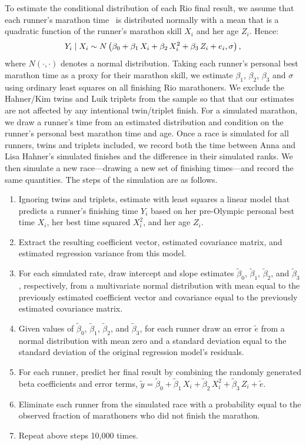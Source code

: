 \documentclass[12pt,titlepage]{article}
\begin{document}
To estimate the conditional distribution of each Rio final result, we
assume that each runner's marathon time \Yi\ is distributed normally
with a mean that is a quadratic function of the runner's marathon skill $X_i$ and her age $Z_i$. Hence:
$$Y_i \mid X_i \sim N\left(\beta_0 + \beta_1\,X_{i} + \beta_2\,X^2_{i}  + \beta_3\,Z_{i} + e_i, \sigma\right),$$
where $N\left(\cdot,\cdot\right)$ denotes a normal distribution. Taking each runner's 
personal best marathon time as a proxy for their marathon skill, we
estimate $\beta_1$, $\beta_2$, $\beta_3$ and $\sigma$ using ordinary least
squares on all finishing Rio marathoners.  We exclude the Hahner/Kim
twins and Luik triplets from the sample so that that our estimates are not affected by any intentional twin/triplet finish.  
For a simulated marathon, we draw a runner's
time from an estimated distribution and condition on the runner's
personal best marathon time and age.  Once a race is simulated for all
runners, twins and triplets included, we record both the time between
Anna and Lisa Hahner's simulated finishes and the difference in their
simulated ranks.  We then simulate a new race---drawing a new set of
finishing times---and record the same quantities. The steps of the
simulation are as follows.
\begin{enumerate}
\item Ignoring twins and triplets, estimate with least squares a
  linear model that predicts a runner's finishing time $Y_i$ based on
  her pre-Olympic personal best time $X_i$, her best time squared $X^2_{i}$, and her age $Z_i$.
\item Extract the resulting coefficient vector, estimated covariance
  matrix, and estimated regression variance from this model.
\item For each simulated rate, draw intercept and slope estimates
  $\tilde{\beta}_0$, $\tilde{\beta}_1$, $\tilde{\beta}_2$, and $\tilde{\beta}_3$,
  respectively, from a multivariate normal distribution with mean
  equal to the previously estimated coefficient vector and covariance
  equal to the previously estimated covariance matrix.
\item Given values of $\tilde{\beta}_0$, $\tilde{\beta}_1$, $\tilde{\beta}_2$, and
  $\tilde{\beta}_3$, for each runner draw an error $\tilde{e}$ from a
  normal distribution with mean zero and a standard deviation equal to
  the standard deviation of the original regression model's residuals.
\item For each runner, predict her final result by combining the
  randomly generated beta coefficients and error terms,
  $\tilde{y} = \tilde{\beta}_0 + \tilde{\beta}_1\,X_i +
  \tilde{\beta}_2\,X_i^2 + \tilde{\beta}_3\,Z_i +  \tilde{e}$.
\item Eliminate each runner from the simulated race with a probability
  equal to the observed fraction of marathoners who did not finish the
  marathon.
\item Repeat above steps 10,000 times.
\end{enumerate}
\end{document}
